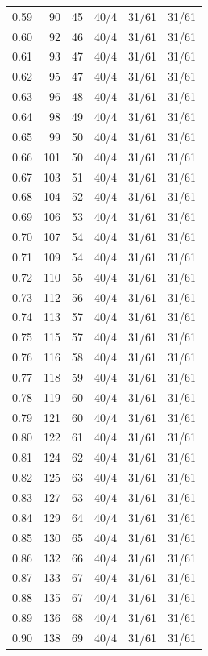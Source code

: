 \documentclass[11pt,a4paper]{article}
\begin{document}
\begin{longtable}{rrrrrr}
0.59 & 90 & 45 & 40/4 & 31/61 & 31/61 \\
0.60 & 92 & 46 & 40/4 & 31/61 & 31/61 \\
0.61 & 93 & 47 & 40/4 & 31/61 & 31/61 \\
0.62 & 95 & 47 & 40/4 & 31/61 & 31/61 \\
0.63 & 96 & 48 & 40/4 & 31/61 & 31/61 \\
0.64 & 98 & 49 & 40/4 & 31/61 & 31/61 \\
0.65 & 99 & 50 & 40/4 & 31/61 & 31/61 \\
0.66 & 101 & 50 & 40/4 & 31/61 & 31/61 \\
0.67 & 103 & 51 & 40/4 & 31/61 & 31/61 \\
0.68 & 104 & 52 & 40/4 & 31/61 & 31/61 \\
0.69 & 106 & 53 & 40/4 & 31/61 & 31/61 \\
0.70 & 107 & 54 & 40/4 & 31/61 & 31/61 \\
0.71 & 109 & 54 & 40/4 & 31/61 & 31/61 \\
0.72 & 110 & 55 & 40/4 & 31/61 & 31/61 \\
0.73 & 112 & 56 & 40/4 & 31/61 & 31/61 \\
0.74 & 113 & 57 & 40/4 & 31/61 & 31/61 \\
0.75 & 115 & 57 & 40/4 & 31/61 & 31/61 \\
0.76 & 116 & 58 & 40/4 & 31/61 & 31/61 \\
0.77 & 118 & 59 & 40/4 & 31/61 & 31/61 \\
0.78 & 119 & 60 & 40/4 & 31/61 & 31/61 \\
0.79 & 121 & 60 & 40/4 & 31/61 & 31/61 \\
0.80 & 122 & 61 & 40/4 & 31/61 & 31/61 \\
0.81 & 124 & 62 & 40/4 & 31/61 & 31/61 \\
0.82 & 125 & 63 & 40/4 & 31/61 & 31/61 \\
0.83 & 127 & 63 & 40/4 & 31/61 & 31/61 \\
0.84 & 129 & 64 & 40/4 & 31/61 & 31/61 \\
0.85 & 130 & 65 & 40/4 & 31/61 & 31/61 \\
0.86 & 132 & 66 & 40/4 & 31/61 & 31/61 \\
0.87 & 133 & 67 & 40/4 & 31/61 & 31/61 \\
0.88 & 135 & 67 & 40/4 & 31/61 & 31/61 \\
0.89 & 136 & 68 & 40/4 & 31/61 & 31/61 \\
0.90 & 138 & 69 & 40/4 & 31/61 & 31/61 \\

\end{longtable}
\end{document}
